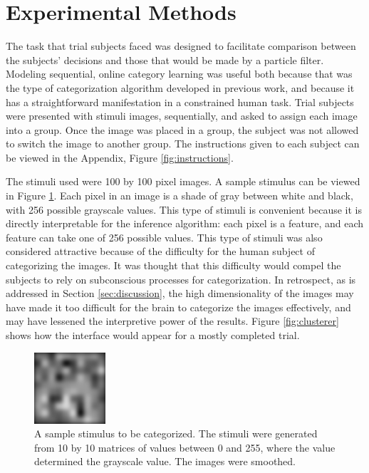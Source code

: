 \section{Experimental Methods}
\label{sec:experiment}
The task that trial subjects faced was designed to facilitate
comparison between the subjects' decisions and those that would be made by a
particle filter. Modeling sequential, online category learning was useful both
because that was the type of categorization algorithm developed in previous
work, and because it has a straightforward manifestation in a constrained human
task. Trial subjects were presented with stimuli images, sequentially, and asked
to assign each image into a group. Once the image was placed in a group, the
subject was not allowed to switch the image to another group. The instructions
given to each subject can be viewed in the Appendix, Figure
\ref{fig:instructions}.

The stimuli used were 100 by 100 pixel images. A sample
stimulus can be viewed in Figure \ref{fig:stimulus}. Each pixel in an
image is a shade of gray between white and black, with 256 possible grayscale
values. This type of stimuli is convenient because it is directly interpretable
for the inference algorithm: each pixel is a feature, and each feature can
take one of 256 possible values. This type of stimuli was also considered
attractive because of the difficulty for the human subject of categorizing the
images. It was thought that this difficulty would compel the subjects to rely on
subconscious processes for categorization. In retrospect, as is addressed in
Section \ref{sec:discussion}, the high dimensionality of the images may have
made it too difficult for the brain to categorize the images effectively, and
may have lessened the interpretive power of the results. Figure
\ref{fig:clusterer} shows how the interface would appear for a mostly completed trial.

\begin{figure}
\centering
\includegraphics[scale=1]{img/stimulus.png}
\caption{A sample stimulus to be categorized. The stimuli were generated from
  10 by 10 matrices of values between 0 and 255, where the value determined the
  grayscale value. The images were smoothed.}
\label{fig:stimulus}
\end{figure}


